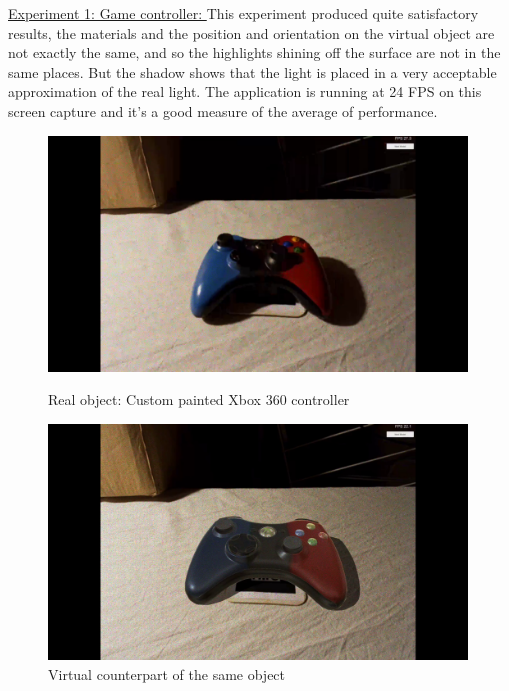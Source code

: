 \underline{Experiment 1: Game controller: } This experiment produced quite satisfactory results, the materials and the position and orientation on the virtual object are not exactly the same, and so the highlights shining off the surface are not in the same places. But the shadow shows that the light is placed in a very acceptable approximation of the real light. The application is running at 24 FPS on this screen capture and it's a good measure of the average of performance. 
\begin{figure}[H]
    \centering
    \begin{minipage}{0.5\textwidth}
        \centering
        \includegraphics[width=0.99\textwidth]{Figures/ContReal.png} %
        \caption{Real object: Custom painted Xbox 360 controller}
    \end{minipage}\hfill
    \begin{minipage}{0.5\textwidth}
        \centering
        \includegraphics[width=0.99\textwidth]{Figures/ContVirtual.png} %
        \caption{Virtual counterpart of the same object}
    \end{minipage}
\end{figure}

